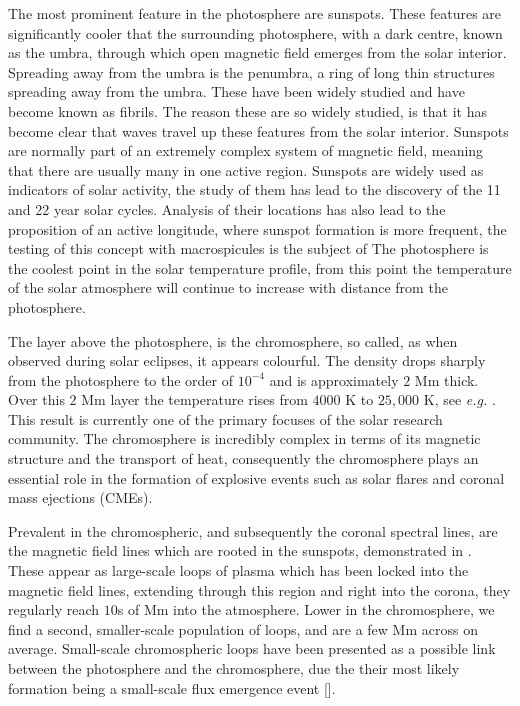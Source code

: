 The most prominent feature in the photosphere are sunspots.
These features are significantly cooler that the surrounding photosphere, with a dark centre, known as the umbra, through which open magnetic field emerges from the solar interior.
Spreading away from the umbra is the penumbra, a ring of long thin structures spreading away from the umbra.
These have been widely studied and have become known as fibrils.
The reason these are so widely studied, is that it has become clear that waves travel up these features from the solar interior.
Sunspots are normally part of an extremely complex system of magnetic field, meaning that there are usually many in one active region.
Sunspots are widely used as indicators of solar activity, the study of them has lead to the discovery of the 11 and 22 year solar cycles.
Analysis of their locations has also lead to the proposition of an active longitude, where sunspot formation is more frequent, the testing of this concept with macrospicules is the subject of 
The photosphere is the coolest point in the solar temperature profile, from this point the temperature of the solar atmosphere will continue to increase with distance from the photosphere.

The layer above the photosphere, is the chromosphere, so called, as when observed during solar eclipses, it appears colourful.
The density drops sharply from the photosphere to the order of $10^{-4}$ and is approximately $2$ Mm thick. 
Over this $2$ Mm layer the temperature rises from $4000$ K to $25,000$ K, see \emph{e.g.} \cite{Withbroe1977}.
This result is currently one of the primary focuses of the solar research community.
The chromosphere is incredibly complex in terms of its magnetic structure and the transport of heat, consequently the chromosphere plays an essential role in the formation of explosive events such as solar flares and coronal mass ejections (CMEs).

Prevalent in the chromospheric, and subsequently the coronal spectral lines, are the magnetic field lines which are rooted in the sunspots, demonstrated in \cite{Athay1976}.
These appear as large-scale loops of plasma which has been locked into the magnetic field lines, extending through this region and right into the corona, they regularly reach $10$s of Mm into the atmosphere.
Lower in the chromosphere, we find a second, smaller-scale population of loops, and are a few Mm across on average.
Small-scale chromospheric loops have been presented as a possible link between the photosphere and the chromosphere, due the their most likely formation being a small-scale flux emergence event [\cite{Ulmschneider1982}].

